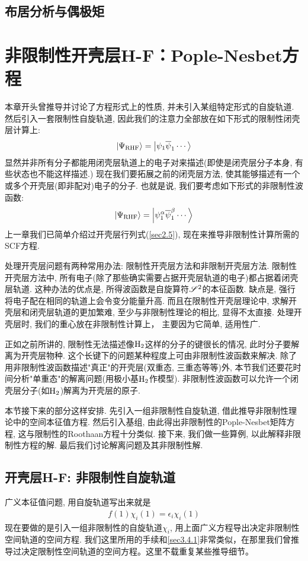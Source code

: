 \subsection{布居分析与偶极矩}

\section{非限制性开壳层H-F：Pople-Nesbet方程}
本章开头曾推导并讨论了\hft 方程形式上的性质, 并未引入某组特定形式的自旋轨道. 然后引入一套限制性自旋轨道, 因此我们的注意力全部放在如下形式的限制性闭壳层计算上:
\begin{align}
\Ket{\Psi_\mathrm{RHF}} = \Ket{\psi_1\overline{\psi}_1\cdots}
\end{align}
显然并非所有分子都能用闭壳层轨道上的电子对来描述(即使是闭壳层分子本身, 有些状态也不能这样描述.) 现在我们要拓展之前的闭壳层方法, 使其能够描述有一个或多个开壳层(即非配对)电子的分子. 也就是说, 我们要考虑如下形式的非限制性波函数:
\begin{align}
\Ket{\Psi_\mathrm{RHF}} = \Ket{\psi_1^\alpha\overline{\psi}_1^\beta\cdots}
\end{align}
上一章我们已简单介绍过开壳层行列式(\ref{sec2.5}), 现在来推导非限制性计算所需的SCF方程.

处理开壳层问题有两种常用办法: 限制性开壳层\hft 方法和非限制开壳层\hft 方法. 限制性开壳层方法中, 所有电子(除了那些确实需要占据开壳层轨道的电子)都占据着闭壳层轨道. 这种办法的优点是, 所得波函数是自旋算符$\mathscr{S}^2$的本征函数. 缺点是, 强行将电子配在相同的轨道上会令变分能量升高. 而且在限制性开壳层\hft 理论中, 求解开壳层和闭壳层轨道的更加繁难, 至少与非限制性\hft 理论的相比, 显得不太直接. 处理开壳层时, 我们的重心放在非限制性计算上， 主要因为它简单, 适用性广.

正如之前所讲的, 限制性\hft  无法描述像$\mathrm{H}_2$这样的分子的键很长的情况, 此时分子要解离为开壳层物种. 这个长键下的问题某种程度上可由非限制性波函数来解决. 除了用非限制性波函数描述"真正"的开壳层(双重态, 三重态等等)外, 本节我们还要花时间分析"单重态"的解离问题(用极小基$\mathrm{H}_2$作模型). 非限制性波函数可以允许一个闭壳层分子(如$\mathrm{H}_2$)解离为开壳层的原子.

本节接下来的部分这样安排. 先引入一组非限制性自旋轨道, 借此推导非限制性\hft 理论中的空间本征值方程. 然后引入基组, 由此得出非限制性的Pople-Nesbet矩阵方程, 这与限制性的Roothaan方程十分类似. 接下来, 我们做一些算例, 以此解释非限制性方程的解. 最后我们讨论解离问题及其非限制性解.
\subsection{开壳层H-F: 非限制性自旋轨道}
广义\hft 本征值问题, 用自旋轨道写出来就是
\begin{align}
f(1)\chi_i(1) = \epsilon_i \chi_i(1)
\end{align}
现在要做的是引入一组非限制性的自旋轨道$\chi_i$, 用上面广义\hft 方程导出决定非限制性空间轨道的空间方程. 我们这里所用的手续和\ref{sec3.4.1}非常类似，在那里我们曾推导过决定限制性空间轨道的空间方程。这里不载重复某些推导细节。

